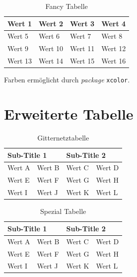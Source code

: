 \documentclass{scrreprt}
\begin{document}
\begin{table}[h!]
	\centering
	\caption{Fancy Tabelle}
	\label{my-label}
	\begin{tabular}{llll}
		Wert 1  & Wert 2   & Wert 3  & Wert 4  \\ \hline
		Wert 5  &  Wert 6  & Wert 7  & Wert 8  \\ \hline
		Wert 9  &  Wert 10 & Wert 11 & Wert 12 \\ \hline
		Wert 13 & Wert 14  & Wert 15  & Wert 16 \\ \hline
	\end{tabular}
\end{table}

Farben ermöglicht durch \textit{package} \texttt{xcolor}.

\section{Erweiterte Tabelle}

\begin{table}[htbp]
	\caption{Gitternetztabelle}
	\label { Tabelle 1.0}
	\centering
	\begin{tabular}{|l|l|l|l|}
		\hline
		\multicolumn{2}{|l|}{Sub-Title 1} & \multicolumn{2}{l|}{Sub-Title 2} \\ \hline
		Wert A          & Wert B          & Wert C          & Wert D         \\ \hline
		Wert E          & Wert F          & Wert G          & Wert H         \\ \hline
		Wert I          & Wert J          & Wert K          & Wert L         \\ \hline
	\end{tabular}
\end{table}

\begin{table}[h!]

\centering
\caption{Spezial Tabelle}
\label{my-label}
	
\begin{tabular}{|l|l|l|l|}

\hline
\multicolumn{2}{|l|}{Sub-Title 1} & \multicolumn{2}{l|}{Sub-Title 2} \\ \hline
Wert A          & Wert B          & Wert C          & Wert D         \\ \hline
Wert E          & Wert F          & Wert G          & Wert H         \\ \hline
Wert I          & Wert J          & Wert K          & Wert L         \\ \hline
\end{tabular}
\end{table}
\newpage
\end{document}
